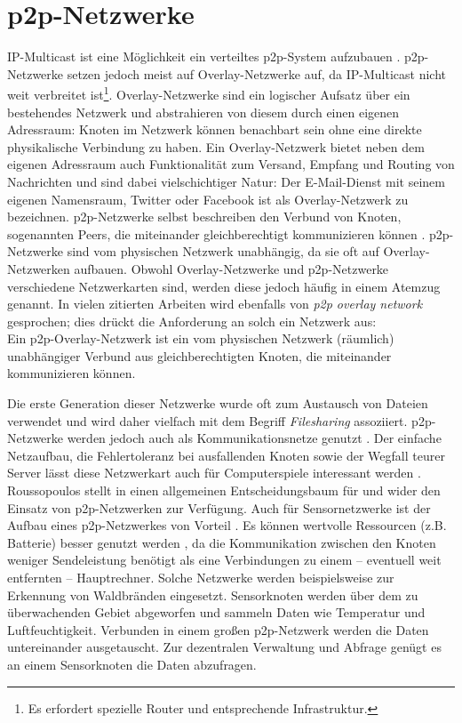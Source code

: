 \section{p2p-Netzwerke}
\label{chap:grundlagen:p2p}
IP-Multicast ist eine Möglichkeit ein verteiltes \ac{p2p}-System aufzubauen \cite{Deering1990Multicast}. \ac{p2p}-Netzwerke setzen jedoch meist auf Overlay-Netzwerke auf, da IP-Multicast nicht weit verbreitet ist\footnote{Es erfordert spezielle Router und entsprechende Infrastruktur.}. Overlay-Netzwerke sind ein logischer Aufsatz über ein bestehendes Netzwerk und abstrahieren von diesem durch einen eigenen Adressraum: Knoten im Netzwerk können benachbart sein ohne eine direkte physikalische Verbindung zu haben. Ein Overlay-Netzwerk bietet neben dem eigenen Adressraum auch Funktionalität zum Versand, Empfang und Routing von Nachrichten \cite{Tannenbaum2003} und sind dabei vielschichtiger Natur: Der E-Mail-Dienst mit seinem eigenen Namensraum, Twitter oder Facebook ist als Overlay-Netzwerk zu bezeichnen. p2p-Netzwerke selbst beschreiben den Verbund von Knoten, sogenannten Peers, die miteinander gleichberechtigt kommunizieren können \cite{Steinmetz2005}. p2p-Netzwerke sind vom physischen Netzwerk unabhängig, da sie oft auf Overlay-Netzwerken aufbauen. Obwohl Overlay-Netzwerke und \ac{p2p}-Netzwerke verschiedene Netzwerkarten sind, werden diese jedoch häufig in einem Atemzug genannt. In vielen zitierten Arbeiten wird ebenfalls von \emph{p2p overlay network} gesprochen; dies drückt die Anforderung an solch ein Netzwerk aus:\\
Ein p2p-Overlay-Netzwerk ist ein vom physischen Netzwerk (räumlich) unabhängiger Verbund aus gleichberechtigten Knoten, die miteinander kommunizieren können.

Die erste Generation dieser Netzwerke wurde oft zum Austausch von Dateien verwendet und wird daher vielfach mit dem Begriff \emph{Filesharing} assoziiert. p2p-Netzwerke werden jedoch auch als Kommunikationsnetze genutzt \cite{Darlagiannis2006Peertopeer}. Der einfache Netzaufbau, die Fehlertoleranz bei ausfallenden Knoten sowie der Wegfall teurer Server lässt diese Netzwerkart auch für Computerspiele interessant werden \cite{Knutsson2004Peertopeer, Triebel2008Peertopeer}. Roussopoulos stellt in \cite{Roussopoulos20032} einen allgemeinen Entscheidungsbaum für und wider den Einsatz von p2p-Netzwerken zur Verfügung. Auch für Sensornetzwerke ist der Aufbau eines p2p-Netzwerkes von Vorteil \cite{MuneebAliandKoenLangendoen2007Case}. Es können wertvolle Ressourcen (z.B. Batterie) besser genutzt werden \cite{Sioutas2009Building}, da die Kommunikation zwischen den Knoten weniger Sendeleistung benötigt als eine Verbindungen zu einem -- eventuell weit entfernten -- Hauptrechner. Solche Netzwerke werden beispielsweise zur Erkennung von Waldbränden eingesetzt. Sensorknoten werden über dem zu überwachenden Gebiet abgeworfen und sammeln Daten wie Temperatur und Luftfeuchtigkeit. Verbunden in einem großen p2p-Netzwerk werden die Daten untereinander ausgetauscht. Zur dezentralen Verwaltung und Abfrage genügt es an einem Sensorknoten die Daten abzufragen.

